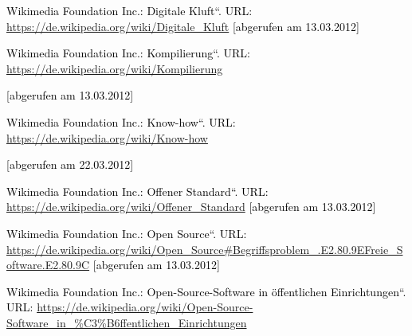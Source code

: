 \documentclass[a4paper]{article}
\newcommand\textstyleInternetlink[1]{\foreignlanguage{english}{\textcolor[rgb]{0.0,0.0,0.5019608}{#1}}}
\begin{document}
\bigskip

{
\textstyleInternetlink{\textcolor{black}{Wikimedia Foundation Inc.:
{\quotedblbase}Digitale Kluft{\textquotedblleft}. URL:
}}\url{https://de.wikipedia.org/wiki/Digitale_Kluft}\textstyleInternetlink{\textcolor{black}{
[abgerufen am 13.03.2012]}}}


\bigskip

{
\textstyleInternetlink{\textcolor{black}{Wikimedia Foundation Inc.:
{\quotedblbase}Kompilierung{\textquotedblleft}. URL:
}}\url{https://de.wikipedia.org/wiki/Kompilierung}}

{
\textstyleInternetlink{\textcolor{black}{[abgerufen am 13.03.2012]}}}


\bigskip

{
\textstyleInternetlink{\textcolor{black}{Wikimedia Foundation Inc.:
{\quotedblbase}Know-how{\textquotedblleft}. URL:
}}\url{https://de.wikipedia.org/wiki/Know-how}}

{
\textstyleInternetlink{\textcolor{black}{[abgerufen am 22.03.2012]}}}


\bigskip

{
\textstyleInternetlink{\textcolor{black}{Wikimedia Foundation Inc.:
{\quotedblbase}Offener Standard{\textquotedblleft}.
URL:}}\textstyleInternetlink{\foreignlanguage{ngerman}{\textcolor{black}{
}}}\url{https://de.wikipedia.org/wiki/Offener_Standard}\textstyleInternetlink{\textcolor{black}{
}}\textcolor{black}{[abgerufen am 13.03.2012]}}


\bigskip

{
\foreignlanguage{english}{\textcolor{black}{Wikimedia Foundation Inc.:
{\quotedblbase}Open Source{\textquotedblleft}. URL:
}}\href{https://de.wikipedia.org/wiki/Open_Source#Begriffsproblem_.E2.80.9EFreie_Software.E2.80.9C
}{\textstyleInternetlink{https://de.wikipedia.org/wiki/Open\_Source\#Begriffsproblem\_.E2.80.9EFreie\_Software.E2.80.9C}}\foreignlanguage{english}{\textcolor{black}{
[abgerufen am 13.03.2012]}}}


\bigskip

{
\textstyleInternetlink{\textcolor{black}{Wikimedia Foundation Inc.:
{\quotedblbase}Open-Source-Software in \"offentlichen
Einrichtungen{\textquotedblleft}.
URL:}}\textstyleInternetlink{\foreignlanguage{english}{\textcolor{black}{
}}}\href{https://de.wikipedia.org/wiki/Open-Source-Software_in_?ffentlichen_Einrichtungen}{\textstyleInternetlink{https://de.wikipedia.org/wiki/Open-Source-Software\_in\_\%C3\%B6ffentlichen\_Einrichtungen}}}
\end{document}
